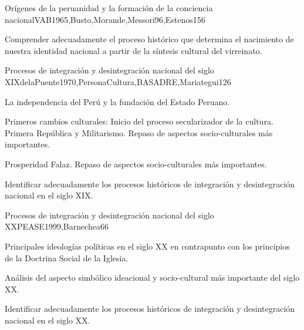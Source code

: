 \begin{syllabus}
\begin{unit}{Orígenes de la peruanidad y la formación de la conciencia nacional}{VAB1965,Busto,Morande,Messori96,Estenos}{15}{6}
\begin{topics}
\end{topics}
\begin{learningoutcomes}
	\item Comprender adecuadamente el proceso histórico que determina el nacimiento de nuestra identidad nacional a partir de la síntesis cultural del virreinato.
\end{learningoutcomes}
\end{unit}

\begin{unit}{Procesos de integración y desintegración nacional del siglo XIX}{delaPuente1970,PersonaCultura,BASADRE,Mariategui}{12}{6}
\begin{topics}
	\item La independencia del Perú y la fundación del Estado Peruano.
	\item Primeros cambios culturales: Inicio del proceso secularizador de la cultura. Primera República y Militarismo. Repaso de  aspectos socio-culturales más importantes.
	\item Prosperidad Falaz.  Repaso de  aspectos socio-culturales más importantes. 
\end{topics}
\begin{learningoutcomes}
	\item Identificar adecuadamente los procesos históricos de integración y desintegración nacional en el siglo XIX.
\end{learningoutcomes}
\end{unit}

\begin{unit}{Procesos de integración y desintegración nacional del siglo XX}{PEASE1999,Barnechea}{6}{6}
\begin{topics}
	\item Principales ideologías políticas en el siglo XX en contrapunto con los principios de la Doctrina Social de la Iglesia.
	\item Análisis del aspecto simbólico ideacional y socio-cultural más importante del siglo XX. 

\end{topics}
\begin{learningoutcomes}
	\item Identificar adecuadamente los procesos históricos de integración y desintegración nacional en el siglo XX. 
\end{learningoutcomes}
\end{unit}


\end{syllabus}
